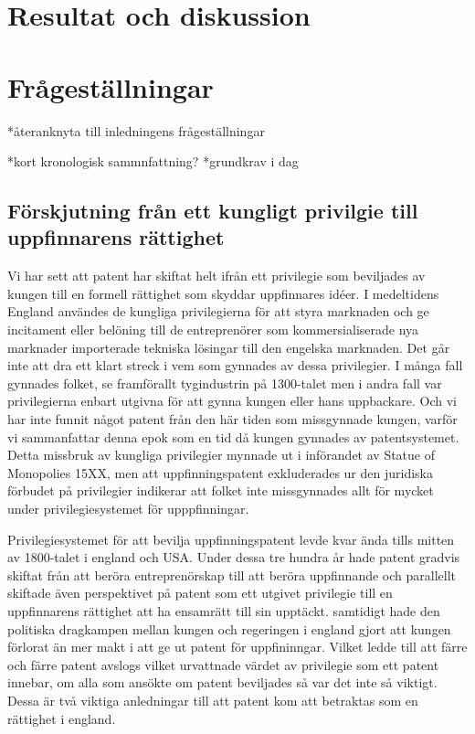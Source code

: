 \section{Resultat och diskussion}



\section{Frågeställningar}
*återanknyta till inledningens frågeställningar

*kort kronologisk sammnfattning? 
*grundkrav i dag

\subsection{Förskjutning från ett kungligt privilgie till uppfinnarens rättighet}
Vi har sett att patent har skiftat helt ifrån ett privilegie som beviljades av kungen till en formell rättighet som skyddar uppfinnares idéer. I medeltidens England användes de kungliga privilegierna för att styra marknaden och ge incitament eller belöning till de entreprenörer som kommersialiserade nya marknader importerade tekniska lösingar till den engelska marknaden. Det går inte att dra ett klart streck i vem som gynnades av dessa privilegier. I många fall gynnades folket, se framförallt tygindustrin på 1300-talet %
men i andra fall var privilegierna enbart utgivna för att gynna kungen eller hans uppbackare.%
Och vi har inte funnit något patent från den här tiden som missgynnade kungen, varför vi sammanfattar denna epok som en tid då kungen gynnades av patentsystemet. Detta missbruk av kungliga privilegier mynnade ut i införandet av Statue of Monopolies 15XX, men att uppfinningspatent exkluderades ur den juridiska förbudet på privilegier indikerar att folket inte missgynnades allt för mycket under privilegiesystemet för upppfinningar.

Privilegiesystemet för att bevilja uppfinningspatent levde kvar ända tills mitten av 1800-talet i england och USA. Under dessa tre hundra år hade patent gradvis skiftat från att beröra entreprenörskap till att beröra uppfinnande och parallellt skiftade även perspektivet på patent som ett utgivet privilegie till en uppfinnarens rättighet att ha ensamrätt till sin upptäckt. samtidigt hade den politiska dragkampen mellan kungen och regeringen i england gjort att kungen förlorat än mer makt i att ge ut patent för uppfininngar. Vilket ledde till att färre och färre patent avslogs vilket urvattnade värdet av privilegie som ett patent innebar, om alla som ansökte om patent beviljades så var det inte så viktigt. Dessa är två viktiga anledningar till att patent kom att betraktas som en rättighet i england.

